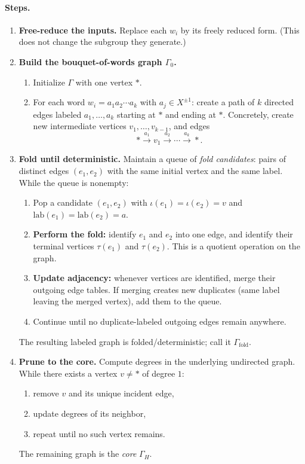 \documentclass[11pt]{article}
\theoremstyle{definition}
\theoremstyle{plain}
\theoremstyle{remark}
\newcommand{\lab}{\mathrm{lab}}
\begin{document}
\paragraph{Steps.}
\begin{enumerate}[leftmargin=2.2em]
\item \textbf{Free-reduce the inputs.}
Replace each $w_i$ by its freely reduced form. (This does not change the subgroup they generate.)

\item \textbf{Build the bouquet-of-words graph $\Gamma_0$.}
\begin{enumerate}[leftmargin=2em]
\item Initialize $\Gamma$ with one vertex $*$.
\item For each word $w_i=a_1a_2\cdots a_k$ with $a_j\in X^{\pm1}$:
create a path of $k$ directed edges labeled $a_1,\dots,a_k$ starting at $*$ and ending at $*$.
Concretely, create new intermediate vertices $v_1,\dots,v_{k-1}$, and edges
\[
* \xrightarrow{a_1} v_1 \xrightarrow{a_2}\cdots\xrightarrow{a_k} *.
\]
\end{enumerate}

\item \textbf{Fold until deterministic.}
Maintain a queue of \emph{fold candidates}:
pairs of distinct edges $(e_1,e_2)$ with the same initial vertex and the same label.
While the queue is nonempty:
\begin{enumerate}[leftmargin=2em]
\item Pop a candidate $(e_1,e_2)$ with $\iota(e_1)=\iota(e_2)=v$ and $\lab(e_1)=\lab(e_2)=a$.
\item \textbf{Perform the fold:} identify $e_1$ and $e_2$ into one edge, and identify their terminal vertices $\tau(e_1)$ and $\tau(e_2)$.
This is a quotient operation on the graph.
\item \textbf{Update adjacency:} whenever vertices are identified, merge their outgoing edge tables.
If merging creates new duplicates (same label leaving the merged vertex), add them to the queue.
\item Continue until no duplicate-labeled outgoing edges remain anywhere.
\end{enumerate}
The resulting labeled graph is folded/deterministic; call it $\Gamma_{\mathrm{fold}}$.

\item \textbf{Prune to the core.}
Compute degrees in the underlying undirected graph.
While there exists a vertex $v\neq *$ of degree $1$:
\begin{enumerate}[leftmargin=2em]
\item remove $v$ and its unique incident edge,
\item update degrees of its neighbor,
\item repeat until no such vertex remains.
\end{enumerate}
The remaining graph is the \emph{core} $\Gamma_H$.
\end{enumerate}
\end{document}
